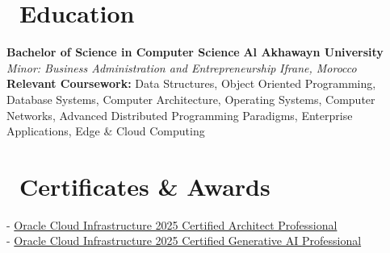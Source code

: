 \documentclass[a4paper, 10pt]{article}
\begin{document}
\section{\faGraduationCap\  Education}
\textbf{Bachelor of Science in Computer Science} \hfill \textbf{Al Akhawayn University} \\
\textit{Minor: Business Administration and Entrepreneurship} \hfill \textit{Ifrane, Morocco} \\
\textbf{Relevant Coursework:} Data Structures, Object Oriented Programming, Database Systems, Computer Architecture, Operating Systems, Computer Networks, Advanced Distributed Programming Paradigms, Enterprise Applications, Edge \& Cloud Computing

\section{\faAward\ Certificates \& Awards}
- \href{https://catalog-education.oracle.com/ords/certview/sharebadge?id=6ED86FBEB704E80D6E9BC8B80AF40836F447C3EC75A5E8661AF34FC0AFFF04E5}{Oracle Cloud Infrastructure 2025 Certified Architect Professional} {\scriptsize\textcolor{gray}{\faExternalLink}} \\
- \href{https://catalog-education.oracle.com/ords/certview/sharebadge?id=7AEC49B8C2627C38749A181392EFCD096F2A92E136E653876CA336B24BF52232}{Oracle Cloud Infrastructure 2025 Certified Generative AI Professional} {\scriptsize\textcolor{gray}{\faExternalLink}}
\end{document}
